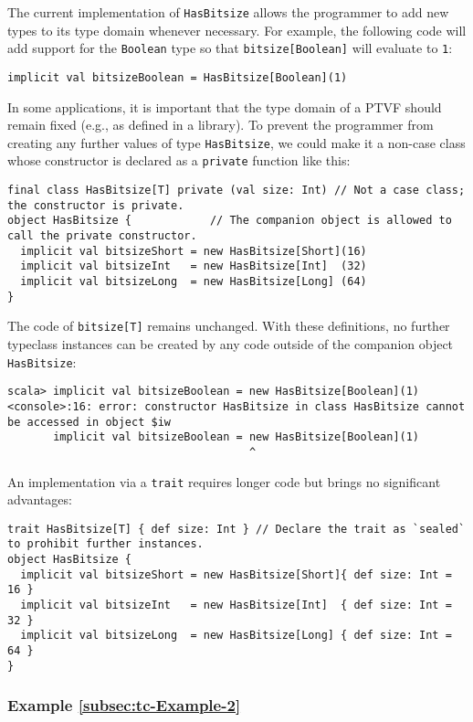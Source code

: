The current implementation of \lstinline!HasBitsize! allows the programmer
to add new types to its type domain whenever necessary. For example,
the following code will add support for the \lstinline!Boolean! type
so that \lstinline!bitsize[Boolean]! will evaluate to \lstinline!1!:
\begin{lstlisting}
implicit val bitsizeBoolean = HasBitsize[Boolean](1)
\end{lstlisting}
In some applications, it is important that the type domain of a PTVF
should remain fixed (e.g., as defined in a library). To prevent the
programmer from creating any further values of type \lstinline!HasBitsize!,
we could make it a non-case class whose constructor is declared as
a \lstinline!private! function like this:
\begin{lstlisting}
final class HasBitsize[T] private (val size: Int) // Not a case class; the constructor is private.
object HasBitsize {            // The companion object is allowed to call the private constructor.
  implicit val bitsizeShort = new HasBitsize[Short](16)
  implicit val bitsizeInt   = new HasBitsize[Int]  (32)
  implicit val bitsizeLong  = new HasBitsize[Long] (64)
}
\end{lstlisting}
The code of \lstinline!bitsize[T]! remains unchanged. With these
definitions, no further typeclass instances can be created by any
code outside of the companion object \lstinline!HasBitsize!:
\begin{lstlisting}
scala> implicit val bitsizeBoolean = new HasBitsize[Boolean](1)
<console>:16: error: constructor HasBitsize in class HasBitsize cannot be accessed in object $iw
       implicit val bitsizeBoolean = new HasBitsize[Boolean](1)
                                     ^
\end{lstlisting}

An implementation via a \lstinline!trait! requires longer code but
brings no significant advantages:
\begin{lstlisting}
trait HasBitsize[T] { def size: Int } // Declare the trait as `sealed` to prohibit further instances.
object HasBitsize {
  implicit val bitsizeShort = new HasBitsize[Short]{ def size: Int = 16 }
  implicit val bitsizeInt   = new HasBitsize[Int]  { def size: Int = 32 }
  implicit val bitsizeLong  = new HasBitsize[Long] { def size: Int = 64 }
}
\end{lstlisting}


\subsubsection{Example \label{subsec:tc-Example-2}\ref{subsec:tc-Example-2}}


